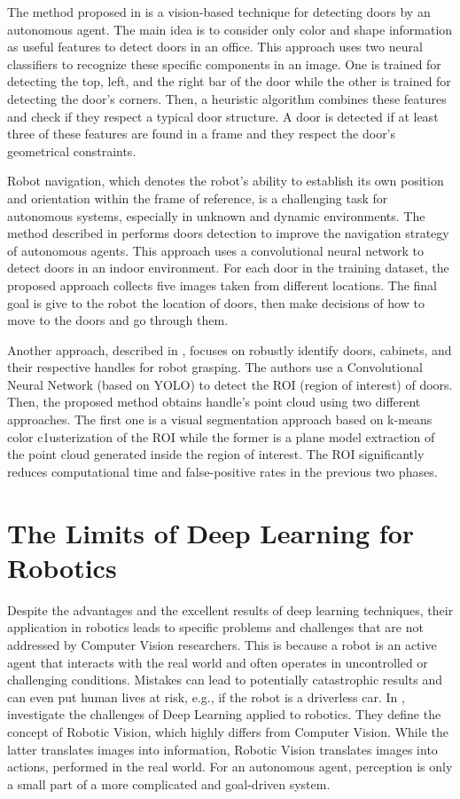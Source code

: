  The method proposed in \cite{detectdoorsfeature} is a vision-based technique for detecting doors by an autonomous agent. The main idea is to consider only color and shape information as useful features to detect doors in an office. This approach uses two neural classifiers to recognize these specific components in an image. One is trained for detecting the top, left, and the right bar of the door while the other is trained for detecting the door's corners. Then, a heuristic algorithm combines these features and check if they respect a typical door structure. A door is detected if at least three of these features are found in a frame and they respect the door's geometrical constraints. 
 
 Robot navigation, which denotes the robot's ability to establish its own position and orientation within the frame of reference, is a challenging task for autonomous systems, especially in unknown and dynamic environments. The method described in \cite{doorsandnavigation} performs doors detection to improve the navigation strategy of autonomous agents. This approach uses a convolutional neural network to detect doors in an indoor environment. For each door in the training dataset, the proposed approach collects five images taken from different locations. The final goal is give to the robot the location of doors, then make decisions of how to move to the doors and go through them.
 
 Another approach, described in \cite{doorcabinet}, focuses on robustly identify doors, cabinets, and their respective handles for robot grasping. The authors use a Convolutional Neural Network (based on YOLO) to detect the ROI (region of interest) of doors. Then, the proposed method obtains handle's point cloud using two different approaches. The first one is a visual segmentation approach based on k-means color c1usterization of the ROI while the former is a plane model extraction of the point cloud generated inside the region of interest. The ROI significantly reduces computational time and false-positive rates in the previous two phases.
 
 \section{The Limits of Deep Learning for Robotics}
 
 Despite the advantages and the excellent results of deep learning techniques, their application in robotics leads to specific problems and challenges that are not addressed by Computer Vision researchers. This is because a robot is an active agent that interacts with the real world and often operates in uncontrolled or challenging conditions. Mistakes can lead to potentially catastrophic results and can even put human lives at risk, e.g., if the robot is a driverless car. In \cite{surveydeeplimits}, \citeauthor{surveydeeplimits} investigate the challenges of Deep Learning applied to robotics. They define the concept of Robotic Vision, which highly differs from Computer Vision. While the latter translates images into information, Robotic Vision translates images into actions, performed in the real world. For an autonomous agent, perception is only a small part of a more complicated and goal-driven system. 
 
